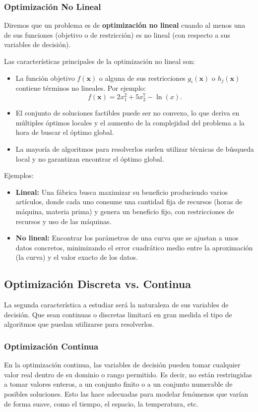 \documentclass[12pt,a4paper]{book}
\begin{document}
\subsubsection{Optimización No Lineal}
Diremos que un problema es de \textbf{optimización no lineal} cuando al menos una de sus funciones (objetivo o de restricción) es no lineal (con respecto a sus variables de decisión). 

Las características principales de la optimización no lineal son:
\begin{itemize}
    \item La función objetivo $f(\mathbf{x})$ o alguna de sus restricciones $g_i(\mathbf{x})$ o $h_j(\mathbf{x})$ contiene términos no lineales. Por ejemplo:
    $$f(\mathbf{x})=2x_1^2+5x_2^7-\ln(x).$$
    \item El conjunto de soluciones factibles puede ser no convexo, lo que deriva en múltiples óptimos locales y el aumento de la complejidad del problema a la hora de buscar el óptimo global.
    \item La mayoría de algoritmos para resolverlos suelen utilizar técnicas de búsqueda local y no garantizan encontrar el óptimo global.
\end{itemize}

Ejemplos:
\begin{itemize}
    \item \textbf{Lineal:} Una fábrica busca maximizar su beneficio produciendo varios artículos, donde cada uno consume una cantidad fija de recursos (horas de máquina, materia prima) y genera un beneficio fijo, con restricciones de recursos y uso de las máquinas.
    \item \textbf{No lineal:} Encontrar los parámetros de una curva que se ajustan a unos datos concretos, minimizando el error cuadrático medio entre la aproximación (la curva) y el valor exacto de los datos.
\end{itemize}


\subsection{Optimización Discreta vs. Continua}
La segunda característica a estudiar será la naturaleza de sus variables de decisión. Que sean continuas o discretas
limitará en gran medida el tipo de algoritmos que puedan utilizarse para resolverlos.

\subsubsection{Optimización Continua}
En la optimización continua, las variables de decisión pueden tomar cualquier valor real dentro de su dominio o rango permitido. Es decir, no están restringidas a tomar valores enteros, a un conjunto finito o a un conjunto numerable de posibles soluciones. Esto las hace adecuadas para modelar fenómenos que varían de forma suave, como el tiempo, el espacio, la temperatura, etc.
\end{document}
